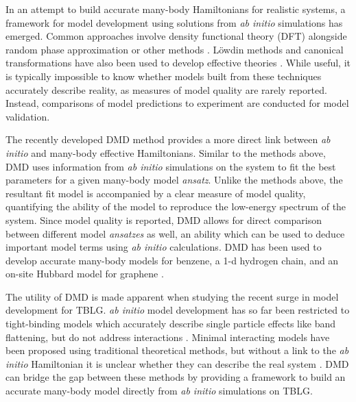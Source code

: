 \documentclass[12pt]{article}
\begin{document}
In an attempt to build accurate many-body Hamiltonians for realistic systems, a framework for model development using solutions from \textit{ab initio} simulations has emerged.
Common approaches involve density functional theory (DFT) \cite{PhysRev.140.A1133, PhysRevLett.87.047003} alongside random phase approximation or other methods \cite{PhysRevB.62.R16219, PhysRevB.70.195104, PhysRevB.88.075106}.
L\"owdin methods and canonical transformations have also been used to develop effective theories \cite{doi:10.1063/1.4802766, PhysRevA.81.013402, doi:10.1063/1.2196410}.
While useful, it is typically impossible to know whether models built from these techniques accurately describe reality, as measures of model quality are rarely reported.
Instead, comparisons of model predictions to experiment are conducted for model validation.

The recently developed DMD \cite{Zheng2017} method provides a more direct link between \textit{ab initio} and many-body effective Hamiltonians.
Similar to the methods above, DMD uses information from \textit{ab initio} simulations on the system to fit the best parameters for a given many-body model \textit{ansatz}.
Unlike the methods above, the resultant fit model is accompanied by a clear measure of model quality, quantifying the ability of the model to reproduce the low-energy spectrum of the system.
Since model quality is reported, DMD allows for direct comparison between different model \textit{ansatzes} as well, an ability which can be used to deduce important model terms using \textit{ab initio} calculations.
DMD has been used to develop accurate many-body models for benzene, a 1-d hydrogen chain, and an on-site Hubbard model for graphene \cite{Zheng2017, Wagner2015}.

The utility of DMD is made apparent when studying the recent surge in model development for TBLG.
\textit{ab initio} model development has so far been restricted to tight-binding models which accurately describe single particle effects like band flattening, but do not address interactions \cite{Fang, Fang2016, PhysRevX.8.031088, PhysRevX.8.031087}.
Minimal interacting models have been proposed using traditional theoretical methods, but without a link to the \textit{ab initio} Hamiltonian it is unclear whether they can describe the real system \cite{PhysRevB.98.045103, PhysRevB.100.125116, PhysRevX.8.031089}.
DMD can bridge the gap between these methods by providing a framework to build an accurate many-body model directly from \textit{ab initio} simulations on TBLG.
\end{document}
